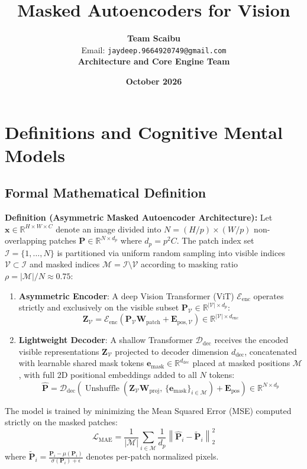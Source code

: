 \documentclass[11pt,a4paper]{article}
\title{\textbf{Masked Autoencoders for Vision}}
\author{\textbf{Team Scaibu} \\ \small Email: \texttt{jaydeep.9664920749@gmail.com} \\ \small \textbf{Architecture and Core Engine Team}}
\date{\textbf{October 2026}}
\theoremstyle{definition}
\begin{document}
\maketitle

\section{Definitions and Cognitive Mental Models}

\subsection{Formal Mathematical Definition}
\textbf{Definition (Asymmetric Masked Autoencoder Architecture):}
Let $\mathbf{x} \in \mathbb{R}^{H \times W \times C}$ denote an image divided into $N = (H/p) \times (W/p)$ non-overlapping patches $\mathbf{P} \in \mathbb{R}^{N \times d_p}$ where $d_p = p^2 C$. The patch index set $\mathcal{I} = \{1, \dots, N\}$ is partitioned via uniform random sampling into visible indices $\mathcal{V} \subset \mathcal{I}$ and masked indices $\mathcal{M} = \mathcal{I} \setminus \mathcal{V}$ according to masking ratio $\rho = |\mathcal{M}| / N \approx 0.75$:
\begin{enumerate}
    \item \textbf{Asymmetric Encoder}: A deep Vision Transformer (ViT) $\mathcal{E}_{\text{enc}}$ operates strictly and exclusively on the visible subset $\mathbf{P}_{\mathcal{V}} \in \mathbb{R}^{|\mathcal{V}| \times d_p}$:
    {\boldmath
    \begin{equation}
    \mathbf{Z}_{\mathcal{V}} = \mathcal{E}_{\text{enc}}\left( \mathbf{P}_{\mathcal{V}} \mathbf{W}_{\text{patch}} + \mathbf{E}_{\text{pos},\mathcal{V}} \right) \in \mathbb{R}^{|\mathcal{V}| \times d_{\text{enc}}}
    \end{equation}
    }
    \item \textbf{Lightweight Decoder}: A shallow Transformer $\mathcal{D}_{\text{dec}}$ receives the encoded visible representations $\mathbf{Z}_{\mathcal{V}}$ projected to decoder dimension $d_{\text{dec}}$, concatenated with learnable shared mask tokens $\mathbf{e}_{\text{mask}} \in \mathbb{R}^{d_{\text{dec}}}$ placed at masked positions $\mathcal{M}$, with full 2D positional embeddings added to all $N$ tokens:
    {\boldmath
    \begin{equation}
    \hat{\mathbf{P}} = \mathcal{D}_{\text{dec}}\left( \operatorname{Unshuffle}\left( \mathbf{Z}_{\mathcal{V}} \mathbf{W}_{\text{proj}}, \, \{\mathbf{e}_{\text{mask}}\}_{i \in \mathcal{M}} \right) + \mathbf{E}_{\text{pos}} \right) \in \mathbb{R}^{N \times d_p}
    \end{equation}
    }
\end{enumerate}
The model is trained by minimizing the Mean Squared Error (MSE) computed strictly on the masked patches:
{\boldmath
\begin{equation}
\mathcal{L}_{\text{MAE}} = \frac{1}{|\mathcal{M}|} \sum_{i \in \mathcal{M}} \frac{1}{d_p} \left\| \hat{\mathbf{P}}_i - \tilde{\mathbf{P}}_i \right\|_2^2
\end{equation}
}
where $\tilde{\mathbf{P}}_i = \frac{\mathbf{P}_i - \mu(\mathbf{P}_i)}{\sigma(\mathbf{P}_i) + \epsilon}$ denotes per-patch normalized pixels.
\end{document}
